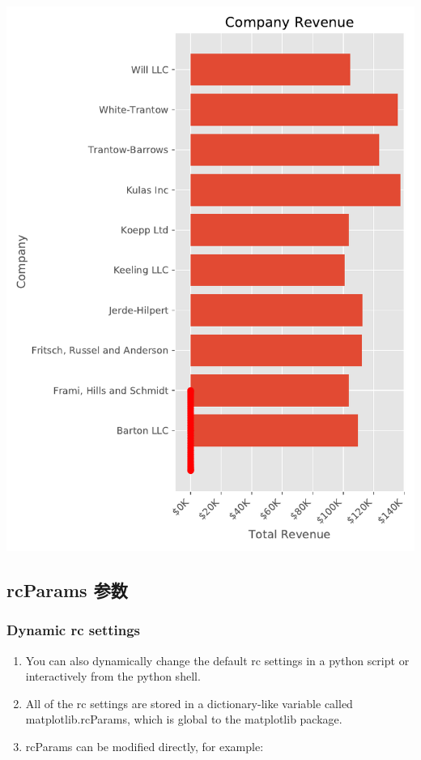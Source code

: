 \documentclass[UTF8,a4paper,12pt]{ctexart}  %
\providecommand{\tightlist}{\setlength{\itemsep}{0pt}\setlength{\parskip}{0pt}}
\begin{document}
\begin{center}\includegraphics[width=0.9\linewidth]{python-visualization_files/figure-latex/unnamed-chunk-34-1} \end{center}

\hypertarget{rcparams-ux53c2ux6570}{%
\subsection{rcParams 参数}\label{rcparams-ux53c2ux6570}}

\hypertarget{dynamic-rc-settings}{%
\subsubsection{Dynamic rc settings}\label{dynamic-rc-settings}}

\begin{enumerate}
\def\labelenumi{\arabic{enumi}.}
\tightlist
\item
  You can also dynamically change the default rc settings in a python
  script or interactively from the python shell.
\item
  All of the rc settings are stored in a dictionary-like variable
  called matplotlib.rcParams, which is global to the matplotlib
  package.
\item
  rcParams can be modified directly, for example:
\end{enumerate}
\end{document}
